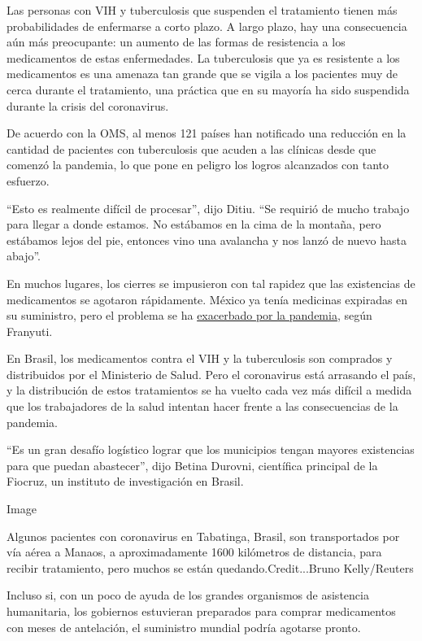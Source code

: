Las personas con VIH y tuberculosis que suspenden el tratamiento tienen
más probabilidades de enfermarse a corto plazo. A largo plazo, hay una
consecuencia aún más preocupante: un aumento de las formas de
resistencia a los medicamentos de estas enfermedades. La tuberculosis
que ya es resistente a los medicamentos es una amenaza tan grande que se
vigila a los pacientes muy de cerca durante el tratamiento, una práctica
que en su mayoría ha sido suspendida durante la crisis del coronavirus.

De acuerdo con la OMS, al menos 121 países han notificado una reducción
en la cantidad de pacientes con tuberculosis que acuden a las clínicas
desde que comenzó la pandemia, lo que pone en peligro los logros
alcanzados con tanto esfuerzo.

``Esto es realmente difícil de procesar'', dijo Ditiu. ``Se requirió de
mucho trabajo para llegar a donde estamos. No estábamos en la cima de la
montaña, pero estábamos lejos del pie, entonces vino una avalancha y nos
lanzó de nuevo hasta abajo''.

En muchos lugares, los cierres se impusieron con tal rapidez que las
existencias de medicamentos se agotaron rápidamente. México ya tenía
medicinas expiradas en su suministro, pero el problema se ha
\href{https://www.reuters.com/article/us-health-coronavirus-lgbt-aids/no-medicine-no-food-coronavirus-restrictions-amplify-health-risks-to-lgbt-people-with-hiv-idUSKBN22W28G}{exacerbado
por la pandemia}, según Franyuti.

En Brasil, los medicamentos contra el VIH y la tuberculosis son
comprados y distribuidos por el Ministerio de Salud. Pero el coronavirus
está arrasando el país, y la distribución de estos tratamientos se ha
vuelto cada vez más difícil a medida que los trabajadores de la salud
intentan hacer frente a las consecuencias de la pandemia.

``Es un gran desafío logístico lograr que los municipios tengan mayores
existencias para que puedan abastecer'', dijo Betina Durovni, científica
principal de la Fiocruz, un instituto de investigación en Brasil.

Image

Algunos pacientes con coronavirus en Tabatinga, Brasil, son
transportados por vía aérea a Manaos, a aproximadamente 1600 kilómetros
de distancia, para recibir tratamiento, pero muchos se están
quedando.Credit...Bruno Kelly/Reuters

Incluso si, con un poco de ayuda de los grandes organismos de asistencia
humanitaria, los gobiernos estuvieran preparados para comprar
medicamentos con meses de antelación, el suministro mundial podría
agotarse pronto.

